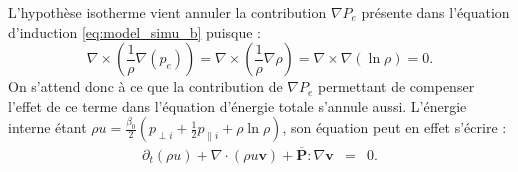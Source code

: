  L'hypothèse isotherme vient annuler la contribution $\nabla P_e$ présente dans l'équation d'induction \eqref{eq:model_simu_b} puisque : 
 \begin{equation*}
      \nabla \times \left( \frac{1}{\rho} \nabla \left(  p_e\right) \right) =  \nabla \times \left( \frac{1}{\rho} \nabla  \rho \right) = \nabla \times  \nabla \left( \ln \rho \right) = 0.
 \end{equation*}
 On s'attend donc à ce que la contribution de $\nabla P_e$ permettant de compenser l'effet de ce terme dans l'équation d'énergie totale s'annule aussi. L'énergie interne étant $\rho u = \frac{\beta_0}{2} \left(p_{\perp i } + \frac{1}{2}p_{\parallel i} + \rho \ln \rho \right) $, son équation peut en effet s'écrire :
 \begin{eqnarray}
 \label{eq:mcgl_ui} \partial_t \left(\rho u\right) + \nabla \cdot \left(\rho u \boldsymbol{v}\right) +  \overline{\boldsymbol{P}}: \nabla \boldsymbol{v} &=& 0.
 \end{eqnarray}
 
